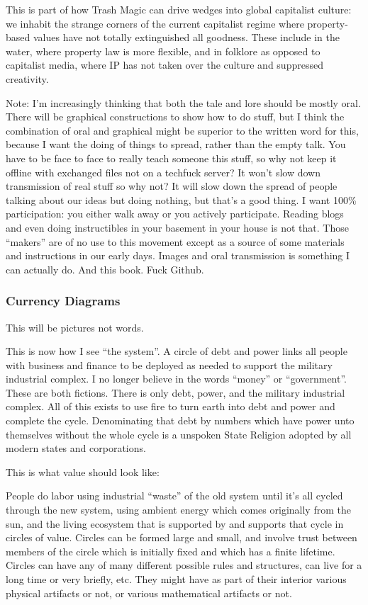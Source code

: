 This is part of how Trash Magic can drive wedges into global capitalist
culture: we inhabit the strange corners of the current capitalist regime
where property-based values have not totally extinguished all goodness.
These include in the water, where property law is more flexible, and in
folklore as opposed to capitalist media, where IP has not taken over the
culture and suppressed creativity.

Note: I'm increasingly thinking that both the tale and lore should be
mostly oral. There will be graphical constructions to show how to do
stuff, but I think the combination of oral and graphical might be
superior to the written word for this, because I want the doing of
things to spread, rather than the empty talk. You have to be face to
face to really teach someone this stuff, so why not keep it offline with
exchanged files not on a techfuck server? It won't slow down
transmission of real stuff so why not? It will slow down the spread of
people talking about our ideas but doing nothing, but that's a good
thing. I want 100\% participation: you either walk away or you actively
participate. Reading blogs and even doing instructibles in your basement
in your house is not that. Those ``makers'' are of no use to this
movement except as a source of some materials and instructions in our
early days. Images and oral transmission is something I can actually do.
And this book. Fuck Github.

\subsubsection{Currency Diagrams}\label{currency-diagrams}

This will be pictures not words.

This is now how I see ``the system''. A circle of debt and power links
all people with business and finance to be deployed as needed to support
the military industrial complex. I no longer believe in the words
``money'' or ``government''. These are both fictions. There is only
debt, power, and the military industrial complex. All of this exists to
use fire to turn earth into debt and power and complete the cycle.
Denominating that debt by numbers which have power unto themselves
without the whole cycle is a unspoken State Religion adopted by all
modern states and corporations.

This is what value should look like:

People do labor using industrial ``waste'' of the old system until it's
all cycled through the new system, using ambient energy which comes
originally from the sun, and the living ecosystem that is supported by
and supports that cycle in circles of value. Circles can be formed large
and small, and involve trust between members of the circle which is
initially fixed and which has a finite lifetime. Circles can have any of
many different possible rules and structures, can live for a long time
or very briefly, etc. They might have as part of their interior various
physical artifacts or not, or various mathematical artifacts or not.

